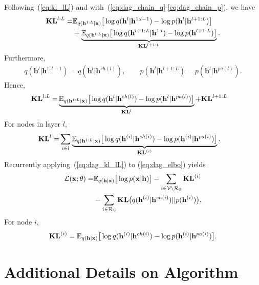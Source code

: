 \documentclass[sigconf, anonymous, review]{acmart}
\theoremstyle{plain}
\theoremstyle{definition}
\theoremstyle{remark}
\begin{document}
Following~(\ref{eq:kl_lL}) and with~(\ref{eq:dag_chain_q}-\ref{eq:dag_chain_p}), we have 
 \begin{align} \notag
\textbf{\text{KL}}^{l:L} 
=&  \mathbb{E}_{q(\mathbf{h}^{1:L}|\mathbf{x})}\big[  \log q(\mathbf{h}^{l}|\mathbf{h}^{1:l-1})   - \log p(\mathbf{h}^{l}|\mathbf{h}^{l+1:L}) \big] \\ \notag
&+ \underbrace{\mathbb{E}_{q(\mathbf{h}^{l:L}|\mathbf{x})}\big[  \log q(\mathbf{h}^{l+1:L}|\mathbf{h}^{1:l})- \log p(\mathbf{h}^{l+1:L})  \big]}_{\mathbf{KL}^{l+1:L}}.
\end{align} %
Furthermore,
\begin{align*} 
q(\mathbf{h}^{l}|\mathbf{h}^{1:l-1})=q(\mathbf{h}^{l}|\mathbf{h}^{ch(l)}), \quad  \quad   p(\mathbf{h}^{l}|\mathbf{h}^{l+1:L}) = p(\mathbf{h}^{l}|\mathbf{h}^{pa(l)}).
\end{align*} %
Hence,
 \begin{align} \label{eq:dag_kl_lL}
\textbf{\text{KL}}^{l:L} 
=&  \underbrace{\mathbb{E}_{q(\mathbf{h}^{1:L}|\mathbf{x})}\big[ \log q(\mathbf{h}^{l}|\mathbf{h}^{ch(l)})  - \log p(\mathbf{h}^{l}|\mathbf{h}^{pa(l)}) \big]}_{\textbf{\text{KL}}^{l}} +\textbf{\text{KL}}^{l+1:L} 
\end{align} %
For nodes in layer $l$,
\begin{align} \notag
\textbf{\text{KL}}^{l} =& \sum_{i \in l} \underbrace{\mathbb{E}_{q(\mathbf{h}^{1:L}|\mathbf{x})}\big[  \log q(\mathbf{h}^{(i)}|\mathbf{h}^{ch(i)})  - \log p(\mathbf{h}^{(i)}|\mathbf{h}^{pa(i)}) \big]}_{\textbf{\text{KL}}^{(i)}} .
\end{align}
Recurrently applying~(\ref{eq:dag_kl_lL}) to (\ref{eq:dag_elbo}) yields
\begin{align}\notag %
\mathcal{L}(\mathbf{x}; \theta) =& \mathbb{E}_{q(\mathbf{h}|\mathbf{x})}\big[ \log p(\mathbf{x}|\mathbf{h})  \big] -  \sum_{i \in \mathcal{V}  \setminus  \mathcal{R}_{ \mathbb{G} }} \textbf{\text{KL}}^{(i)} \\ \notag
&-    \sum_{i \in  \mathcal{R}_{ \mathbb{G} }  }  \textbf{\text{KL}}\big(q(\mathbf{h}^{(i)} | \mathbf{h}^{ch(i)} )   || p(\mathbf{h}^{(i)})  \big) .
\end{align} %
For node $i$, 
$$\textbf{\text{KL}}^{(i)} = \mathbb{E}_{q(\mathbf{h}|\mathbf{x})}\big[  \log q(\mathbf{h}^{(i)}|\mathbf{h}^{ch(i)})  - \log p(\mathbf{h}^{(i)}|\mathbf{h}^{pa(i)}) \big].$$


\section{Additional Details on Algorithm}\label{sec:random_mask}
\end{document}
